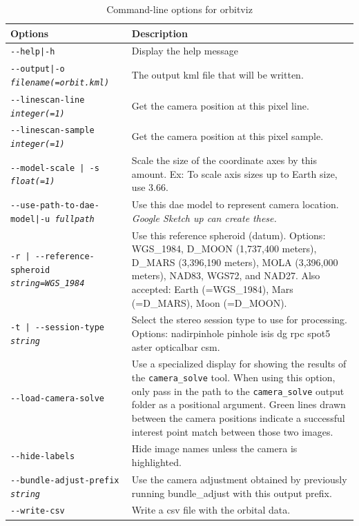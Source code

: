 \begin{longtable}{|l|p{10cm}|}
\caption{Command-line options for orbitviz}
\label{tbl:orbitviz}
\endfirsthead
\endhead
\endfoot
\endlastfoot
\hline
Options & Description \\ \hline \hline
\texttt{-\/-help|-h} & Display the help message\\ \hline

\texttt{-\/-output|-o \textit{filename(=orbit.kml)}} & The output kml file that will be written. \\ \hline

\texttt{-\/-linescan-line \textit{integer(=1)}} & Get the camera position at this pixel line. \\ \hline
\texttt{-\/-linescan-sample \textit{integer(=1)}} & Get the camera position at this pixel sample. \\ \hline

\texttt{-\/-model-scale | -s \textit{float(=1)}} & Scale the size of the coordinate axes by this amount. Ex: To scale axis sizes up to Earth size, use 3.66. \\ \hline

\texttt{-\/-use-path-to-dae-model|-u \textit{fullpath}} & Use this dae model to represent camera location. \emph{Google Sketch up can create these.} \\ \hline

\texttt{-r | -\/-reference-spheroid \textit{string=WGS\_1984}} & Use this reference spheroid (datum). Options: WGS\_1984, D\_MOON (1,737,400 meters), D\_MARS (3,396,190 meters), MOLA (3,396,000 meters), NAD83, WGS72, and NAD27. Also accepted: Earth (=WGS\_1984), Mars (=D\_MARS), Moon (=D\_MOON). \\ \hline

\texttt{-t | -\/-session-type  \textit{string}} & Select the stereo session type to use for processing. Options: nadirpinhole pinhole isis dg rpc spot5 aster opticalbar csm.\\ \hline

\texttt{-\/-load-camera-solve} & Use a specialized display for showing the results of the \texttt{camera\_solve} tool.
When using this option, only pass in the path to the \texttt{camera\_solve} output folder as a positional argument.
Green lines drawn between the camera positions indicate a successful interest point match between those two images.\\ \hline

\texttt{-\/-hide-labels} & Hide image names unless the camera is highlighted.\\ \hline

\texttt{-\/-bundle-adjust-prefix \textit{string}} & Use the camera adjustment obtained by previously running bundle\_adjust with this output prefix.\\ \hline

\texttt{-\/-write-csv} & Write a csv file with the orbital data.\\ \hline

\end{longtable}

